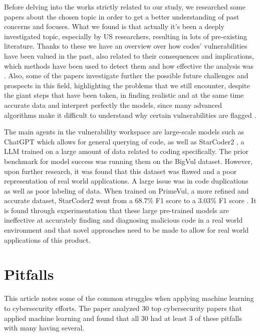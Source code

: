 \documentclass{article}
\begin{document}
Before delving into the works strictly related to our study, we researched some papers about the chosen topic in order to get a better understanding of past concerns and focuses. What we found is that actually it’s been a deeply investigated topic, especially by US researchers, resulting in lots of pre-existing literature. Thanks to these we have an overview over how codes’ vulnerabilities have been valued in the past, also related to their consequences and implications, which methods have been used to detect them and how effective the analysis was \cite{LIANG2025104098}. Also, some of the papers investigate further the possible future challenges and prospects in this field, highlighting the problems that we still encounter, despite the giant steps that have been taken, in finding realistic and at the same time accurate data and interpret perfectly the models, since many advanced algorithms make it difficult to understand why certain vulnerabilities are flagged \cite{harer2018automatedsoftwarevulnerabilitydetection}.

The main agents in the vulnerability workspace are large-scale models such as ChatGPT \cite{openai2024gpt4} which allows for general querying of code, as well as StarCoder2 \cite{lozhkov2024starcoder2stackv2}, a LLM trained on a large amount of data related to coding specifically. The prior benchmark for model success was running them on the BigVul dataset. However, upon further research, it was found that this dataset was flawed and a poor representation of real world applications. A large issue was in code duplications as well as poor labeling of data. When trained on PrimeVul, a more refined and accurate dataset, StarCoder2 went from a 68.7\% F1 score to a 3.03\% F1 score \cite{ding2024vulnerabilitydetectioncodelanguage}. It is found through experimentation that these large pre-trained models are ineffective at accurately finding and diagnosing malicious code in a real world environment and that novel approaches need to be made to allow for real world applications of this product. \cite{ding2024vulnerabilitydetectioncodelanguage}

\section{Pitfalls}

This article notes some of the common struggles when applying machine learning to cybersecurity efforts. The paper analyzed 30 top cybersecurity papers that applied machine learning and found that all 30 had at least 3 of these pitfalls with many having several.
\end{document}
